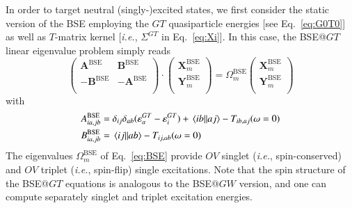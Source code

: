 \documentclass[aip,jcp,reprint,noshowkeys,superscriptaddress]{revtex4-1}
\newcommand{\ie}{\textit{i.e.}}
\newcommand{\BSE}{\text{BSE}}
\newcommand{\GT}{GT}
\newcommand{\e}[2]{\eps_{#1}^{#2}}
\newcommand{\Om}[2]{\Omega_{#1}^{#2}}
\newcommand{\bA}[2]{\mathbf{A}_{#1}^{#2}}
\newcommand{\bB}[2]{\mathbf{B}_{#1}^{#2}}
\newcommand{\bX}[2]{\mathbf{X}_{#1}^{#2}}
\newcommand{\bY}[2]{\mathbf{Y}_{#1}^{#2}}
\newcommand{\eps}{\varepsilon}
\begin{document}
In order to target neutral (singly-)excited states, we first consider the static version of the BSE employing the $GT$ quasiparticle energies [see Eq.~\eqref{eq:G0T0}] as well as $T$-matrix kernel [\ie, $\Sigma^{\GT}$ in Eq.~\eqref{eq:Xi}].
In this case, the BSE@$GT$ linear eigenvalue problem simply reads
\begin{equation}
\label{eq:BSE}
	\begin{pmatrix}
		\bA{}{\BSE}		&	\bB{}{\BSE}	\\
		-\bB{}{\BSE}	&	-\bA{}{\BSE}	\\
	\end{pmatrix}
	\cdot
	\begin{pmatrix}
		\bX{m}{\BSE}	\\
		\bY{m}{\BSE}	\\
	\end{pmatrix}
	=
	\Om{m}{\BSE}
	\begin{pmatrix}
		\bX{m}{\BSE}	\\
		\bY{m}{\BSE}	\\
	\end{pmatrix}
\end{equation}
with 
\begin{subequations}
\begin{align}
	A_{ia,jb}^{\BSE} & = \delta_{ij} \delta_{ab} (\e{a}{\GT} - \e{i}{\GT}) + \mel{ib}{}{aj} - T_{ib,aj}(\omega=0)
	\\ 
	B_{ia,jb}^{\BSE} & = \mel{ij}{}{ab} - T_{ij,ab}(\omega=0)
\end{align}
\end{subequations}
The eigenvalues $\Om{m}{\BSE}$ of Eq.~\eqref{eq:BSE} provide $OV$ singlet (\ie, spin-conserved) and $OV$ triplet  (\ie, spin-flip) single excitations.
Note that the spin structure of the BSE@$GT$ equations is analogous to the BSE@$GW$ version, \cite{Monino_2021} and one can compute separately singlet and triplet excitation energies.
\end{document}
